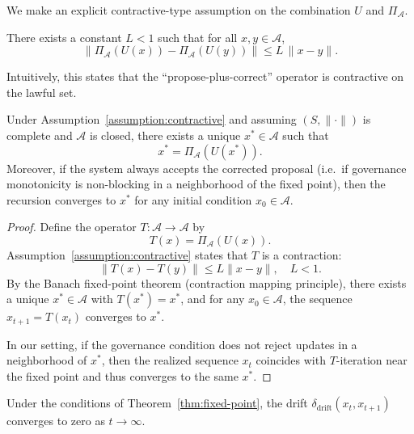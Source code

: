 \documentclass[11pt]{article}
\begin{document}
We make an explicit contractive-type assumption on the combination \(U\) and \(\Pi_{\mathcal{A}}\).

\begin{assumption}
\label{assumption:contractive}
There exists a constant \(L < 1\) such that for all \(x,y \in \mathcal{A}\),
\[
  \|\Pi_{\mathcal{A}}(U(x)) - \Pi_{\mathcal{A}}(U(y))\|
  \le
  L \,\|x - y\|.
\]
\end{assumption}

Intuitively, this states that the ``propose-plus-correct'' operator is contractive on the lawful set.

\begin{theorem}
\label{thm:fixed-point}
Under Assumption~\ref{assumption:contractive} and assuming \((S,\|\cdot\|)\) is complete and \(\mathcal{A}\) is closed, there exists a unique \(x^\ast \in \mathcal{A}\) such that
\[
  x^\ast = \Pi_{\mathcal{A}}(U(x^\ast)).
\]
Moreover, if the system always accepts the corrected proposal (i.e.\ if governance monotonicity is non-blocking in a neighborhood of the fixed point), then the recursion converges to \(x^\ast\) for any initial condition \(x_0 \in \mathcal{A}\).
\end{theorem}

\begin{proof}
Define the operator \(T : \mathcal{A} \to \mathcal{A}\) by
\[
  T(x) = \Pi_{\mathcal{A}}(U(x)).
\]
Assumption~\ref{assumption:contractive} states that \(T\) is a contraction:
\[
  \|T(x) - T(y)\| \le L\|x - y\|, \quad L < 1.
\]
By the Banach fixed-point theorem (contraction mapping principle), there exists a unique \(x^\ast \in \mathcal{A}\) with \(T(x^\ast) = x^\ast\), and for any \(x_0 \in \mathcal{A}\), the sequence \(x_{t+1} = T(x_t)\) converges to \(x^\ast\).%

In our setting, if the governance condition does not reject updates in a neighborhood of \(x^\ast\), then the realized sequence \(x_t\) coincides with \(T\)-iteration near the fixed point and thus converges to the same \(x^\ast\).
\end{proof}

\begin{corollary}
\label{cor:drift-vanish}
Under the conditions of Theorem~\ref{thm:fixed-point}, the drift \(\delta_{\mathrm{drift}}(x_t, x_{t+1})\) converges to zero as \(t \to \infty\).
\end{corollary}
\end{document}
